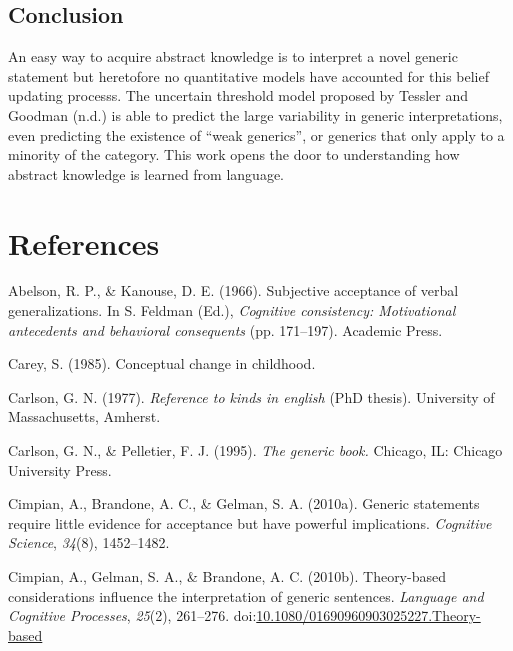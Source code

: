 \documentclass[,man,floatsintext]{apa6}
\theoremstyle{definition}
\theoremstyle{definition}
\theoremstyle{definition}
\theoremstyle{remark}
\begin{document}
\hypertarget{conclusion}{%
\subsection{Conclusion}\label{conclusion}}

An easy way to acquire abstract knowledge is to interpret a novel
generic statement but heretofore no quantitative models have accounted
for this belief updating processs. The uncertain threshold model
proposed by Tessler and Goodman (n.d.) is able to predict the large
variability in generic interpretations, even predicting the existence of
\enquote{weak generics}, or generics that only apply to a minority of
the category. This work opens the door to understanding how abstract
knowledge is learned from language.

\newpage

\hypertarget{references}{%
\section{References}\label{references}}

\hypertarget{refs}{}
\leavevmode\hypertarget{ref-Abelson1966}{}%
Abelson, R. P., \& Kanouse, D. E. (1966). Subjective acceptance of
verbal generalizations. In S. Feldman (Ed.), \emph{Cognitive
consistency: Motivational antecedents and behavioral consequents} (pp.
171--197). Academic Press.

\leavevmode\hypertarget{ref-carey1985conceptual}{}%
Carey, S. (1985). Conceptual change in childhood.

\leavevmode\hypertarget{ref-Carlson1977}{}%
Carlson, G. N. (1977). \emph{Reference to kinds in english}
(PhD thesis). University of Massachusetts, Amherst.

\leavevmode\hypertarget{ref-Carlson1995}{}%
Carlson, G. N., \& Pelletier, F. J. (1995). \emph{The generic book.}
Chicago, IL: Chicago University Press.

\leavevmode\hypertarget{ref-Cimpian2010}{}%
Cimpian, A., Brandone, A. C., \& Gelman, S. A. (2010a). Generic
statements require little evidence for acceptance but have powerful
implications. \emph{Cognitive Science}, \emph{34}(8), 1452--1482.

\leavevmode\hypertarget{ref-Cimpian2010theory}{}%
Cimpian, A., Gelman, S. A., \& Brandone, A. C. (2010b). Theory-based
considerations influence the interpretation of generic sentences.
\emph{Language and Cognitive Processes}, \emph{25}(2), 261--276.
doi:\href{https://doi.org/10.1080/01690960903025227.Theory-based}{10.1080/01690960903025227.Theory-based}
\end{document}
